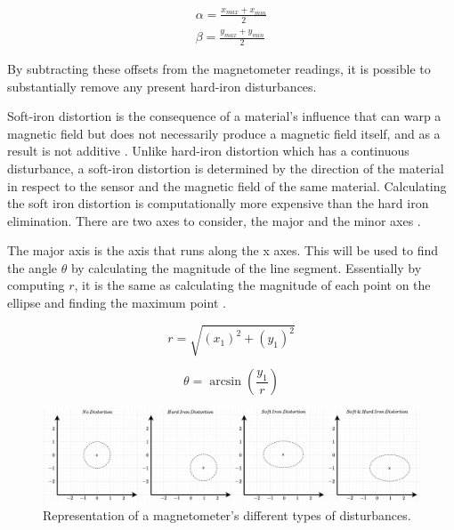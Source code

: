 \begin{equation}
    \begin{gathered}
        \alpha = \frac{x_{max}+x_{min}}{2}\\
        \beta = \frac{y_{max}+y_{min}}{2}
    \end{gathered}
\end{equation}

By subtracting these offsets from the magnetometer readings, it is possible to substantially remove any present hard-iron disturbances.

Soft-iron distortion is the consequence of a material's influence that can warp a magnetic field but does not necessarily produce a magnetic field itself, and as a result is not additive \cite{bachmann2004investigation}. Unlike hard-iron distortion which has a continuous disturbance, a soft-iron distortion is determined by the direction of the material in respect to the sensor and the magnetic field of the same material. Calculating the soft iron distortion is computationally more expensive than the hard iron elimination. There are two axes to consider, the major and the minor axes \cite{roetenberg2005compensation}.

The major axis is the axis that runs along the x axes. This will be used to find the angle $\theta$ by calculating the magnitude of the line segment. Essentially by computing $r$, it is the same as calculating the magnitude of each point on the ellipse and finding the maximum point \cite{daponte2017method}.

\begin{equation}
    r=\sqrt{(x_1)^2+(y_1)^2}
\end{equation}

\begin{equation}
    \theta=\arcsin(\frac{y_1}{r})
\end{equation}

\begin{figure}[!h]
    \centering
    \includegraphics[width=1\textwidth]{figures/magnetometer_distortion.pdf}
    \caption{Representation of a magnetometer's different types of disturbances. \cite{daponte2017method} }
    \label{fig:magnetometer_distortion}
\end{figure}

